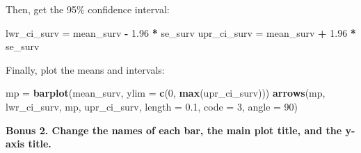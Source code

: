 \documentclass[]{book}
\newenvironment{Shaded}{\begin{snugshade}}{\end{snugshade}}
\newcommand{\KeywordTok}[1]{\textcolor[rgb]{0.13,0.29,0.53}{\textbf{#1}}}
\newcommand{\DataTypeTok}[1]{\textcolor[rgb]{0.13,0.29,0.53}{#1}}
\newcommand{\DecValTok}[1]{\textcolor[rgb]{0.00,0.00,0.81}{#1}}
\newcommand{\FloatTok}[1]{\textcolor[rgb]{0.00,0.00,0.81}{#1}}
\newcommand{\StringTok}[1]{\textcolor[rgb]{0.31,0.60,0.02}{#1}}
\newcommand{\OperatorTok}[1]{\textcolor[rgb]{0.81,0.36,0.00}{\textbf{#1}}}
\newcommand{\NormalTok}[1]{#1}
\theoremstyle{definition}
\theoremstyle{definition}
\theoremstyle{definition}
\theoremstyle{remark}
\begin{document}
\begin{Shaded}
\end{Shaded}

Then, get the 95\% confidence interval:

\begin{Shaded}
\begin{Highlighting}[]
\NormalTok{lwr_ci_surv =}\StringTok{ }\NormalTok{mean_surv }\OperatorTok{-}\StringTok{ }\FloatTok{1.96} \OperatorTok{*}\StringTok{ }\NormalTok{se_surv}
\NormalTok{upr_ci_surv =}\StringTok{ }\NormalTok{mean_surv }\OperatorTok{+}\StringTok{ }\FloatTok{1.96} \OperatorTok{*}\StringTok{ }\NormalTok{se_surv}
\end{Highlighting}
\end{Shaded}

Finally, plot the means and intervals:

\begin{Shaded}
\begin{Highlighting}[]
\NormalTok{mp =}\StringTok{ }\KeywordTok{barplot}\NormalTok{(mean_surv, }\DataTypeTok{ylim =} \KeywordTok{c}\NormalTok{(}\DecValTok{0}\NormalTok{, }\KeywordTok{max}\NormalTok{(upr_ci_surv)))}
\KeywordTok{arrows}\NormalTok{(mp, lwr_ci_surv, mp, upr_ci_surv, }\DataTypeTok{length =} \FloatTok{0.1}\NormalTok{, }\DataTypeTok{code =} \DecValTok{3}\NormalTok{, }\DataTypeTok{angle =} \DecValTok{90}\NormalTok{)}
\end{Highlighting}
\end{Shaded}

\textbf{Bonus 2. Change the names of each bar, the main plot title, and
the y-axis title. }

\begin{Shaded}
\end{Shaded}
\end{document}
